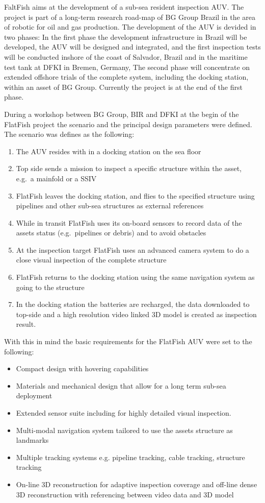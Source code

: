 \documentclass[conference]{IEEEtran}
\begin{document}
FaltFish aims at the development of a sub-sea resident inspection AUV. The project is part of a long-term research road-map of BG Group Brazil in the area of robotic for oil and gas production. The development of the AUV is devided in two phases: In the first phase the development infrastructure in Brazil will be developed, the AUV will be designed and integrated, and the first inspection tests will be conducted inshore of the coast of Salvador, Brazil and in the maritime test tank at DFKI in Bremen, Germany, The second phase will concentrate on extended offshore trials of the complete system, including the docking station, within an asset of BG Group. Currently the project is at the end of the first phase.

During a workshop between BG Group, BIR and DFKI at the begin of the FlatFish project the scenario and the principal design parameters were defined. The scenario was defines as the following:
\begin{enumerate}
	\item The AUV resides with in a docking station on the sea floor
	\item Top side sends a mission to inspect a specific structure within the asset, e.g.~a mainfold or a SSIV
	\item FlatFish leaves the docking station, and flies to the specified structure using pipelines and other sub-sea structures as external references
	\item While in transit FlatFish uses its on-board sensors to record data of the assets status (e.g.~pipelines or debris) and to avoid obstacles
	\item At the inspection target FlatFish uses an advanced camera system to do a close visual inspection of the complete structure
	\item FlatFish returns to the docking station using the same navigation system as going to the structure
	\item In the docking station the batteries are recharged, the data downloaded to top-side and a high resolution video linked 3D model is created as inspection result.
\end{enumerate}
With this in mind the basic requirements for the FlatFish AUV were set to the following:
\begin{itemize}
	\item Compact design with hovering capabilities
	\item Materials and mechanical design that allow for a long term sub-sea deployment
	\item Extended sensor suite including for highly detailed visual inspection.
	\item Multi-modal navigation system tailored to use the assets structure as landmarks
	\item Multiple tracking systems e.g. pipeline tracking, cable tracking, structure tracking
	\item On-line 3D reconstruction for adaptive inspection coverage and off-line dense 3D reconstruction with referencing between video data and 3D model
\end{itemize}
\end{document}
